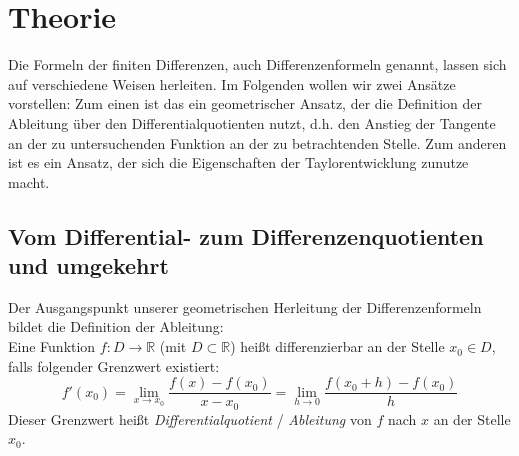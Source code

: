 \documentclass{scrartcl}
\begin{document}
\pagebreak \section{Theorie}
\label{sec:theorie}
Die Formeln der finiten Differenzen, auch Differenzenformeln genannt, lassen sich auf verschiedene Weisen herleiten. Im Folgenden wollen wir zwei Ansätze vorstellen: Zum einen ist das ein geometrischer Ansatz, der die Definition der Ableitung über den Differentialquotienten nutzt, d.h. den Anstieg der Tangente an der zu untersuchenden Funktion an der zu betrachtenden Stelle. Zum anderen ist es ein Ansatz, der sich die Eigenschaften der Taylorentwicklung zunutze macht.

\subsection{Vom Differential- zum Differenzenquotienten und umgekehrt}
\label{ssec:herleitung1}
Der Ausgangspunkt unserer geometrischen Herleitung der Differenzenformeln bildet die Definition der Ableitung: \\
\linebreak
Eine Funktion $f:D \rightarrow \mathbb{R}$ (mit $D\subset \mathbb{R}$) heißt differenzierbar an der Stelle $x_0 \in D$, falls folgender Grenzwert existiert: \[f'(x_0) = \lim _{x\to x_0} {\frac {f(x)-f(x_0)}{x-x_{0}}} = \lim _{h\to 0} {\frac {f(x_0+h)-f(x_0)}{h}}\] Dieser Grenzwert heißt \textit{Differentialquotient} / \textit{Ableitung} von $f$ nach $x$ an der Stelle $x_0$.
\linebreak
\end{document}
